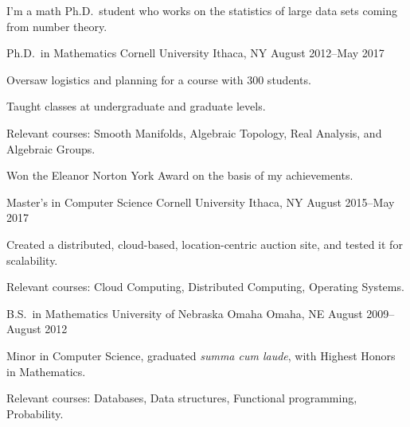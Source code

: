 \documentclass[11pt, letterpaper]{awesome-cv}
\begin{document}
\makecvheader





\begin{cvparagraph}

I'm a math Ph.D.~student who works on the statistics of large data sets coming from number theory. 
\end{cvparagraph}






\begin{cventries}

\cventry
	{Ph.D.~in Mathematics}
	{Cornell University}
	{Ithaca, NY}
	{August 2012--May 2017}
	{
		\begin{cvitems}
			\item{Oversaw logistics and planning for a course with 300 students.}
			\item{Taught classes at undergraduate and graduate levels.}
			\item{Relevant courses: Smooth Manifolds, Algebraic Topology, Real Analysis, and Algebraic Groups.}
			\item{Won the Eleanor Norton York Award on the basis of my achievements.}
		\end{cvitems}
	}
	
\cventry
	{Master's in Computer Science}
	{Cornell University}
	{Ithaca, NY}
	{August 2015--May 2017}
	{
		\begin{cvitems}
			\item{Created a distributed, cloud-based, location-centric auction site, and tested it for scalability.}
			\item{Relevant courses: Cloud Computing, Distributed Computing, Operating Systems.}
		\end{cvitems}
	}
	
\cventry
	{B.S.~in Mathematics}
	{University of Nebraska Omaha}
	{Omaha, NE}
	{August 2009--August 2012}
	{
		\begin{cvitems}
			\item{Minor in Computer Science, graduated \emph{summa cum laude}, with Highest Honors in Mathematics.}
			\item{Relevant courses: Databases, Data structures, Functional programming, Probability.}
		\end{cvitems}
	}
	
\end{cventries}
\end{document}
